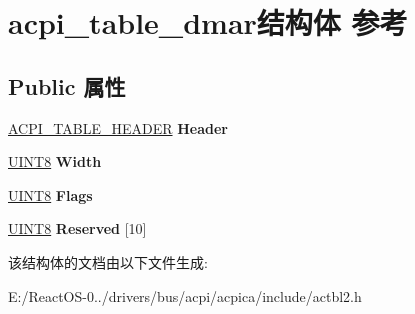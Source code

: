 \hypertarget{structacpi__table__dmar}{}\section{acpi\+\_\+table\+\_\+dmar结构体 参考}
\label{structacpi__table__dmar}
\subsection*{Public 属性}
\begin{DoxyCompactItemize}
\item 
\mbox{\label{structacpi__table__dmar_af3ef375c4985d243dbb7e47a6430d36e}} 
\hyperlink{structacpi__table__header}{A\+C\+P\+I\+\_\+\+T\+A\+B\+L\+E\+\_\+\+H\+E\+A\+D\+ER} {\bfseries Header}
\item 
\mbox{\label{structacpi__table__dmar_af0a03eb70ac09cad3c1f9c0a945a2083}} 
\hyperlink{_processor_bind_8h_ab27e9918b538ce9d8ca692479b375b6a}{U\+I\+N\+T8} {\bfseries Width}
\item 
\mbox{\label{structacpi__table__dmar_a2c203523e3cf01d839e8cddc4d34bb0d}} 
\hyperlink{_processor_bind_8h_ab27e9918b538ce9d8ca692479b375b6a}{U\+I\+N\+T8} {\bfseries Flags}
\item 
\mbox{\label{structacpi__table__dmar_a266c153520930be8b887a315cc6e4f8c}} 
\hyperlink{_processor_bind_8h_ab27e9918b538ce9d8ca692479b375b6a}{U\+I\+N\+T8} {\bfseries Reserved} \mbox{[}10\mbox{]}
\end{DoxyCompactItemize}


该结构体的文档由以下文件生成\+:\begin{DoxyCompactItemize}
\item 
E\+:/\+React\+O\+S-\/0../drivers/bus/acpi/acpica/include/actbl2.\+h\end{DoxyCompactItemize}
